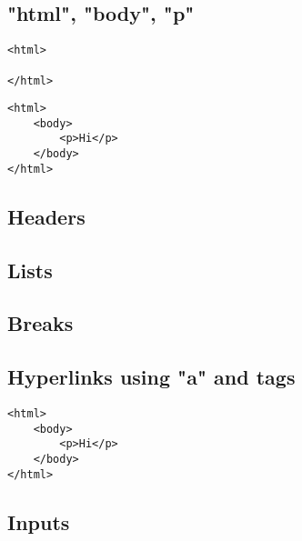 
\subsection{"html", "body", "p"}

\begin{verbatim}
<html>

</html>
\end{verbatim}


\begin{verbatim}
<html>
    <body>
        <p>Hi</p>
    </body>
</html>
\end{verbatim}

\subsection{Headers}


\subsection{Lists}

\subsection{Breaks}

\subsection{Hyperlinks using "a" and tags}



\begin{verbatim}
<html>
    <body>
        <p>Hi</p>
    </body>
</html>
\end{verbatim}


\subsection{Inputs}


